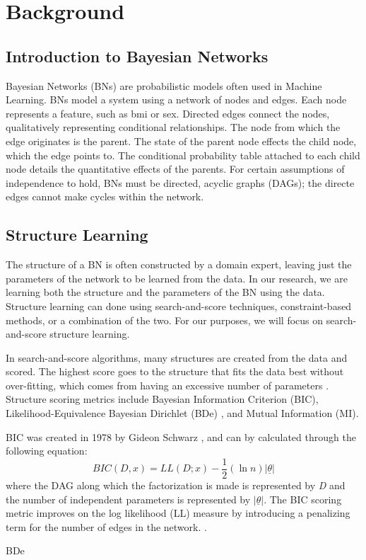 \section{Background}
\subsection{Introduction to Bayesian Networks}

Bayesian Networks (BNs) are probabilistic models often used in Machine Learning. BNs model a system using a network of nodes and edges. Each node represents a feature, such as bmi or sex. Directed edges connect the nodes, qualitatively representing conditional relationships. The node from which the edge originates is the parent. The state of the parent node effects the child node, which the edge points to. The conditional probability table attached to each child node details the quantitative effects of the parents. For certain assumptions of independence to hold, BNs must be directed, acyclic graphs (DAGs); the directe edges cannot make cycles within the network.\cite{Russell1995}

\subsection{Structure Learning}
The structure of a BN is often constructed by a domain expert, leaving just the parameters of the network to be learned from the data. In our research, we are learning both the structure and the parameters of the BN using the data. Structure learning can done using search-and-score techniques, constraint-based methods, or a combination of the two. For our purposes, we will focus on search-and-score structure learning. 

In search-and-score algorithms, many structures are created from the data and scored. The highest score goes to the structure that fits the data best without over-fitting, which comes from having an excessive number of parameters \cite{Vol2012}. Structure scoring metrics include Bayesian Information Criterion (BIC), Likelihood-Equivalence Bayesian Dirichlet (BDe) \cite{Heckerman1995}, and Mutual Information (MI).

BIC was created in 1978 by Gideon Schwarz \cite{Schwarz1978}, and can by calculated through the following equation:
\begin{equation}
    BIC(D, x) = LL(D; x) - \frac{1}{2}(\ln n)|\underline{\theta}|
\end{equation}
where the DAG along which the factorization is made is represented by \textit{D} and the number of independent parameters is represented by \begin{math}|\underline{\theta}|\end{math}. The BIC scoring metric improves on the log likelihood (LL) measure by introducing a penalizing term for the number of edges in the network.  \cite{Vol2012}.

BDe 
